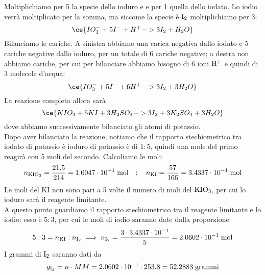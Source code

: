 \begin{soluzione}
    Moltiplichiamo per 5 la specie dello ioduro e e per 1 quella dello iodato. Lo iodio verrà moltiplicato per la somma, ma siccome la specie è $\rm I_2$ moltiplichiamo per 3:
    \begin{equation*}
        \ce{IO_3^- + 5I^- + H^+ -> 3I_2 + H_2O}
    \end{equation*}
    Bilanciamo le cariche. A sinistra abbiamo una carica negativa dallo iodato e 5 cariche negative dallo ioduro, per un totale di 6 cariche negative; a destra non abbiamo cariche, per cui per bilanciare abbiamo bisogno di 6 ioni $\rm H^+$ e quindi di 3 molecole d'acqua:
    \begin{equation*}
        \ce{IO_3^- + 5I^- + 6H^+ -> 3I_2 + 3H_2O}
    \end{equation*}
    La reazione completa allora sarà
    \begin{equation*}
        \ce{KIO_3 + 5KI + 3H_2SO_4 -> 3I_2 + 3K_2SO_4 + 3H_2O}
    \end{equation*}
    dove abbiamo successivamente bilanciato gli atomi di potassio.\\
    Dopo aver bilanciato la reazione, notiamo che il rapporto stechiometrico tra iodato di potassio è ioduro di potassio è di $1:5$, quindi una mole del primo reagirà con 5 moli del secondo. Calcoliamo le moli:
   \begin{equation*}
        n_{\rm KIO_3}=\frac{21.5}{214}=1.0047 \cdot 10^{-1} \; \text{mol}
        \quad;\quad
        n_{\rm KI}=\frac{57}{166}=3.4337 \cdot 10^{-1} \; \rm mol
   \end{equation*}
    Le moli del KI non sono pari a 5 volte il numero di moli del $\rm KIO_3$, per cui lo ioduro sarà il reagente limitante.\\
    A questo punto guardiamo il rapporto stechiometrico tra il reagente limitante e lo iodio: esso è $5:3$, per cui le moli di iodio saranno date dalla proporzione
   \begin{equation*}
    5:3=n_{\rm KI}:n_{\rm I_2}
    \implies
    n_{\rm I_2}=\frac{3 \cdot 3.4337 \cdot 10^{-1}}{5}
    =2.0602 \cdot 10^{-1} \; \rm mol
   \end{equation*}
    I grammi di $\rm I_2$ saranno dati da
   \begin{equation*}
    g_{\rm I_2}=n \cdot MM
    =2.0602 \cdot 10^{-1} \cdot 253.8
    =52.2883 \; \rm grammi
   \end{equation*}
\end{soluzione}

\newpage

